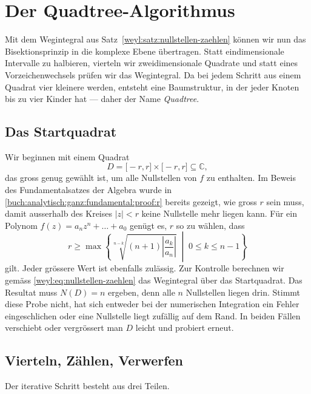 %
%
%
%
%
\section{Der Quadtree-Algorithmus%
\label{weyl:section:algorithmus}}
Mit dem Wegintegral aus Satz~\ref{weyl:satz:nullstellen-zaehlen} können wir nun das
Bisektionsprinzip in die komplexe Ebene übertragen.
Statt eindimensionale Intervalle zu halbieren, vierteln wir zweidimensionale Quadrate und 
statt eines Vorzeichenwechsels prüfen wir das Wegintegral.
Da bei jedem Schritt aus einem Quadrat vier kleinere werden, entsteht eine Baumstruktur,
in der jeder Knoten bis zu vier Kinder hat --- daher der Name \emph{Quadtree}.

\subsection{Das Startquadrat%
\label{weyl:subsection:startquadrat}}
%
Wir beginnen mit einem Quadrat
\[
D
=
\bigl[-r, r\bigr] \times \bigl[-r, r\bigr]
\subseteq
\mathbb{C}
,
\]
das gross genug gewählt ist, um alle Nullstellen von $f$ zu enthalten.
Im Beweis des Fundamentalsatzes der Algebra wurde in
\eqref{buch:analytisch:ganz:fundamental:proof:r} bereits gezeigt, wie gross $r$
sein muss, damit ausserhalb des Kreises $|z| < r$ keine Nullstelle mehr liegen kann.
Für ein Polynom
$f(z) = a_n z^n + \dots + a_0$ genügt es, $r$ so zu wählen, dass
\begin{equation}
r
\geq
\max
\left\{
\sqrt[n-k]{(n+1)\left|\frac{a_k}{a_n}\right|}
\;\middle|\;
0 \leq k \leq n-1
\right\}
\label{weyl:eq:startradius}
\end{equation}
gilt.
Jeder grössere Wert ist ebenfalls zulässig.
Zur Kontrolle berechnen wir gemäss \eqref{weyl:eq:nullstellen-zaehlen} das
Wegintegral über das Startquadrat. Das
Resultat muss $N(D) = n$ ergeben, denn alle $n$ Nullstellen liegen drin.
Stimmt diese Probe nicht, hat sich entweder bei der numerischen Integration ein Fehler
eingeschlichen oder eine Nullstelle liegt zufällig auf dem Rand. In beiden Fällen
verschiebt oder vergrössert man $D$ leicht und probiert erneut.

\subsection{Vierteln, Zählen, Verwerfen%
\label{weyl:subsection:vierteln}}
Der iterative Schritt besteht aus drei Teilen.

